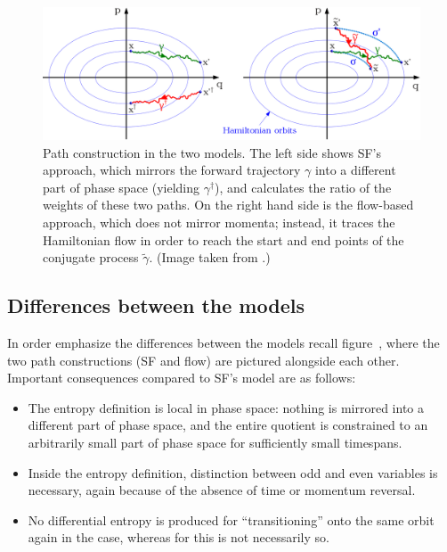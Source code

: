 \begin{figure}[htbp]
	\centering
	\includegraphics[width=0.9 \linewidth]{figures/trajectories}
	\caption[]{Path construction in the two models. The left side shows SF's approach, which mirrors the forward trajectory \(\gamma\) into a different part of phase space (yielding \(\gamma^\dagger\)), and calculates the ratio of the weights of these two paths. On the right hand side is the flow-based approach, which does not mirror momenta; instead, it traces the Hamiltonian flow in order to reach the start and end points of the conjugate process \(\tilde\gamma\). (Image taken from \cite{flow-paper}.)}
	\label{fig:hf sf}
\end{figure}

\subsection{Differences between the models}


In order emphasize the differences between the models recall figure~, where the two path constructions (SF and flow) are pictured alongside each other. Important consequences compared to SF's model are as follows:
%
\begin{itemize}
	\item The \HF{} entropy definition is local in phase space: nothing is mirrored into a different part of phase space, and the entire quotient is constrained to an arbitrarily small part of phase space for sufficiently small timespans.
	\item Inside the \HF{} entropy definition, distinction between odd and even variables is necessary, again because of the absence of time or momentum reversal.
	\item No differential entropy is produced for ``transitioning'' onto the same orbit again in the \HF{} case, whereas for \SF{} this is not necessarily so.
\end{itemize}

